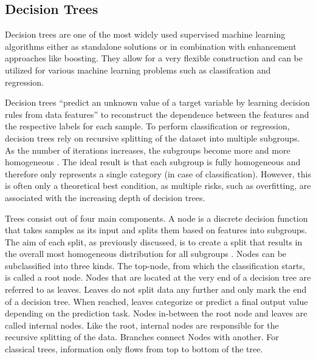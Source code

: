 \subsection{Decision Trees}

Decision trees are one of the most widely used supervised machine learning algorithms either 
as standalone solutions or in combination with enhancement approaches like boosting. 
They allow for a very flexible construction and can be utilized for various machine learning problems
such as classifcation and regression.

Decision trees “predict an unknown value of a target variable by learning decision rules from 
data features” to reconstruct the dependence between the features and the respective labels for 
each sample. To perform classification or regression, decision trees rely on recursive 
splitting of the dataset into multiple subgroups. As the number of iterations increases, the 
subgroups become more and more homogeneous \cite[p.330]{James2021}. The ideal result is that each subgroup is fully 
homogeneous and therefore only represents a single category (in case of classification). However, 
this is often only a theoretical best condition, as multiple risks, such as overfitting, are 
associated with the increasing depth of decision trees.

Trees consist out of four main components. A node is a discrete decision function that takes 
samples as its input and splits them based on features into subgroups. The aim of each split, 
as previously discussed, is to create a split that results in the overall most homogeneous 
distribution for all subgroups \cite[p.6]{lewis2000introduction}. Nodes can be subclassified into three kinds. The top-node, 
from which the classification starts, is called a root node. Nodes that are located at the 
very end of a decision tree are referred to as leaves. Leaves do not split data any further and 
only mark the end of a decision tree. When reached, leaves categorize or predict a final output 
value depending on the prediction task. Nodes in-between the root node and leaves are called 
internal nodes. Like the root, internal nodes are responsible for the recursive splitting of 
the data. Branches connect Nodes with another. For classical trees, information only flows from 
top to bottom of the tree. 


